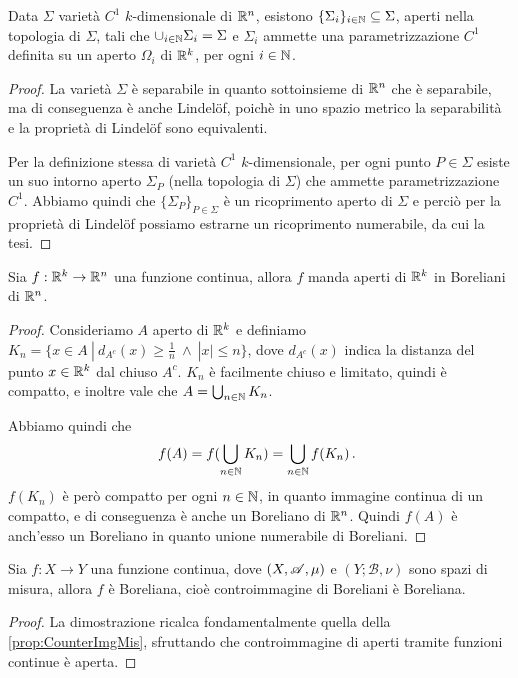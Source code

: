 \begin{proposition}\label{prop:SottovarietaUnioneNumerabile}
	Data $\Sigma$ varietà $C^1$ $k$-dimensionale di $\mathbb R^n$, esistono $\{\Sigma_i\}_{i\in\mathbb N}\subseteq\Sigma$, aperti nella topologia di $\Sigma$, tali che $\cup_{i\in\mathbb N}\Sigma_i=\Sigma$ e $\Sigma_i$ ammette una parametrizzazione $C^1$ definita su un aperto $\Omega_i$ di $\mathbb R^k$, per ogni $i\in\mathbb N$.
\end{proposition}
\begin{proof}
	La varietà $\Sigma$ è separabile in quanto sottoinsieme di $\mathbb R^n$ che è separabile, ma di conseguenza è anche Lindelöf, poichè in uno spazio metrico la separabilità e la proprietà di Lindelöf sono equivalenti.
	
	Per la definizione stessa di varietà $C^1$ $k$-dimensionale, per ogni punto $P\in\Sigma$ esiste un suo intorno aperto $\Sigma_P$ (nella topologia di $\Sigma$) che ammette parametrizzazione $C^1$. Abbiamo quindi che $\{\Sigma_P\}_{P\in\Sigma}$ è un ricoprimento aperto di $\Sigma$ e perciò per la proprietà di Lindelöf possiamo estrarne un ricoprimento numerabile, da cui la tesi.
\end{proof}

\begin{lemma}\label{lemma:ImmagineApertiContinua}
	Sia $f:\mathbb R^k\to\mathbb R^n$ una funzione continua, allora $f$ manda aperti di $\mathbb R^k$ in Boreliani di $\mathbb R^n$.
\end{lemma}
\begin{proof}
	Consideriamo $A$ aperto di $\mathbb R^k$ e definiamo $K_n=\{x\in A\ |\ d_{A^c}(x)\ge\frac 1n\ \wedge\ |x|\le n\}$, dove $d_{A^c}(x)$ indica la distanza del punto $x\in\mathbb R^k$ dal chiuso $A^c$. $K_n$ è facilmente chiuso e limitato, quindi è compatto, e inoltre vale che  $A=\bigcup_{n\in\mathbb N}K_n$.
	
	Abbiamo quindi che
	\begin{equation*}
		f(A)=f(\bigcup_{n\in\mathbb N}K_n)=\bigcup_{n\in\mathbb N}f(K_n)\, \text{. }
	\end{equation*}
	$f(K_n)$ è però compatto per ogni $n\in\mathbb N$, in quanto immagine continua di un compatto, e di conseguenza è anche un Boreliano di $\mathbb R^n$. Quindi $f(A)$ è anch'esso un Boreliano in quanto unione numerabile di Boreliani.	
\end{proof}

\begin{lemma}\label{lemma:ContinuaImplicaBoreliana}
	Sia $f:X\to Y$ una funzione continua, dove $(X,\mathscr A,\mu)$ e $(Y;\mathscr{B},\nu)$ sono spazi di misura, allora $f$ è Boreliana, cioè controimmagine di Boreliani è Boreliana. 
\end{lemma}
\begin{proof}
	La dimostrazione ricalca fondamentalmente quella della \cref{prop:CounterImgMis}, sfruttando che controimmagine di aperti tramite funzioni continue è aperta.
\end{proof}

